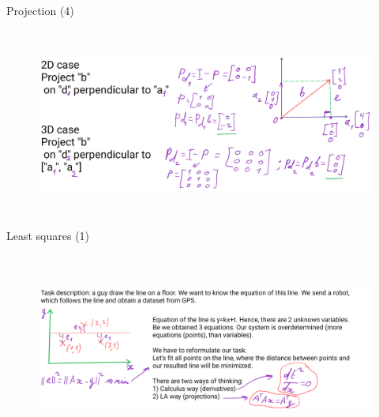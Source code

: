 \documentclass[aspectratio=169]{beamer}
\begin{document}
        \begin{frame}[t]{Projection (4)}
            \framesubtitle{}
                \begin{figure}[H]
                    \centering\includegraphics[height=6cm,width=1\textwidth,keepaspectratio]{AGLA2_for_slides_4.png}
                    \label{fig:AGLA2_for_slides_4.png}
                \end{figure}
            \end{frame}

        \begin{frame}[t]{Least squares (1)}
            \framesubtitle{}
                \begin{figure}[H]
                    \centering\includegraphics[height=6cm,width=1\textwidth,keepaspectratio]{AGLA2_for_slides_5.png}
                    \label{fig:AGLA2_for_slides_5.png}
                \end{figure}
            \end{frame}
\end{document}
